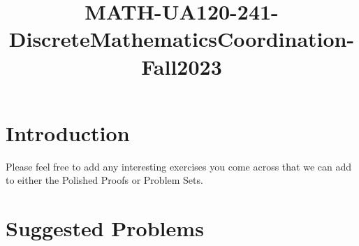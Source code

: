 \documentclass{article}
\title{MATH-UA120-241-DiscreteMathematicsCoordination-Fall2023}
\begin{document}
\maketitle

\section{Introduction}
Please feel free to add any interesting exercises you come across that we can add to either the Polished Proofs or Problem Sets.

\section{Suggested Problems}
\end{document}
